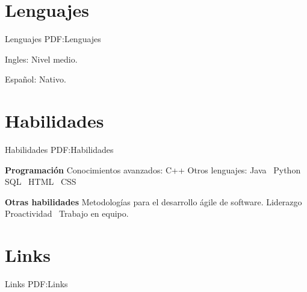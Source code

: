 \documentclass[letterpaper,MMMyyyy,nonstop]{simpleresumecv}
\begin{document}
\begin{body}
%
%


\section
{Lenguajes}
{Lenguajes}
{PDF:Lenguajes}

\BulletItem
Ingles: Nivel medio.

\GapNoBreak
\BulletItem
Español: Nativo.



\section
{Habilidades}
{Habilidades}
{PDF:Habilidades}


\textbf{Programación}
\BulletItem
Conocimientos avanzados: C++
\BulletItem
Otros lenguajes: Java \SubBulletSymbol\, Python \SubBulletSymbol\, SQL \SubBulletSymbol\, HTML \SubBulletSymbol\, CSS

\textbf{Otras habilidades}
\BulletItem Metodologías para el desarrollo ágile de software.
\BulletItem Liderazgo \SubBulletSymbol\, Proactividad \SubBulletSymbol\, Trabajo en equipo.



\section
{Links}
{Links}
{PDF:Links}


\end{body}
\end{document}
